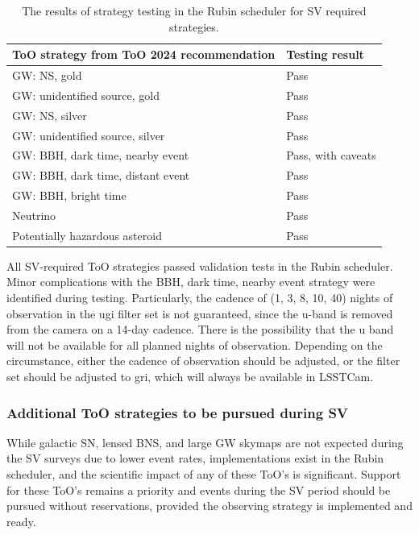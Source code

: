 \begin{table}[]
\centering
\begin{tabular}{|l|l|}
\hline
ToO strategy from ToO 2024 recommendation & Testing result       \\ \hline
GW: NS, gold                              & Pass                 \\ \hline
GW: unidentified source, gold             & Pass                 \\ \hline
GW: NS, silver                            & Pass                 \\ \hline
GW: unidentified source, silver           & Pass                 \\ \hline
GW: BBH, dark time, nearby event                             & Pass, with caveats \\ \hline
GW: BBH, dark time, distant event                              & Pass \\ \hline
GW: BBH, bright time                                & Pass \\ \hline
Neutrino                                  & Pass                 \\ \hline
Potentially hazardous asteroid                      & Pass                 \\ \hline
\end{tabular}
\caption{The results of strategy testing in the Rubin scheduler for SV required strategies.}
\label{tab:SVRequiredStrategy results}
\end{table}

All SV-required ToO strategies passed validation tests in the Rubin scheduler. Minor complications with the BBH, dark time, nearby event strategy were identified during testing. Particularly, the cadence of (1, 3, 8, 10, 40) nights of observation in the ugi filter set is not guaranteed, since the u-band is removed from the camera on a 14-day cadence. There is the possibility that the u band will not be available for all planned nights of observation. Depending on the circumstance, either the cadence of observation should be adjusted, or the filter set should be adjusted to gri, which will always be available in LSSTCam.

\subsubsection{Additional ToO strategies to be pursued during SV}\label{subsubsec:SVOptionalValidation}

While galactic SN, lensed BNS, and large GW skymaps are not expected during the SV surveys due to lower event rates, implementations exist in the Rubin scheduler, and the scientific impact of any of these ToO's is significant. Support for these ToO's remains a priority and events during the SV period should be pursued without reservations, provided the observing strategy is implemented and ready.

